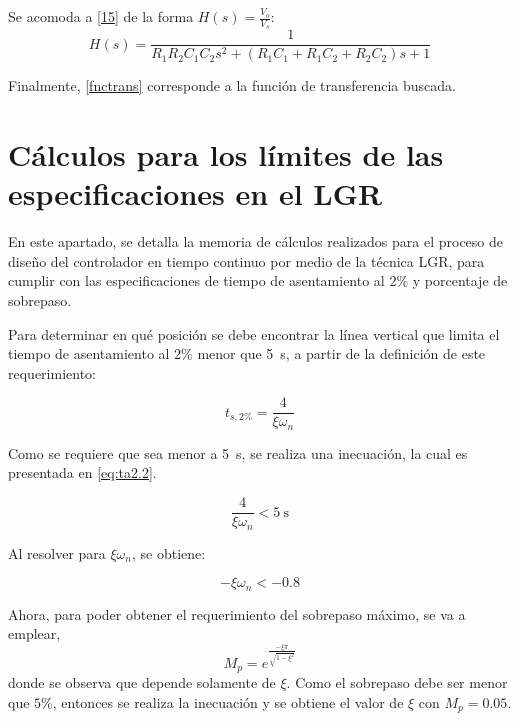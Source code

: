 Se acomoda a \eqref{15} de la forma $H(s) = \frac{V_o}{V_s}$:
\begin{equation}
   H(s) = \frac{1}{R_1 R_2 C_1 C_2 s^2 + (R_1 C_1 + R_1 C_2 +R_2 C_2)s+1}
   \label{fnctrans}
\end{equation}

Finalmente, \eqref{fnctrans} corresponde a la función de transferencia buscada.

\section{Cálculos para los límites de las especificaciones en el LGR} \label{anexoB}

En este apartado, se detalla la memoria de cálculos realizados para el proceso de diseño del controlador en tiempo continuo por medio de la técnica LGR, para cumplir con las especificaciones de tiempo de asentamiento al $2 \%$ y porcentaje de sobrepaso.

Para determinar en qué posición se debe encontrar la línea vertical que limita el tiempo de asentamiento al $2\%$ menor que \SI{5}{\second}, a partir de la definición de este requerimiento:

\begin{equation} \label{eq:ta2.1}
    t_{s,2\%}=\frac{4}{\xi\omega_n} 
\end{equation}

Como se requiere que sea menor a \SI{5}{\second}, se realiza una inecuación, la cual es presentada en \eqref{eq:ta2.2}.

\begin{equation}\label{eq:ta2.2}
    \frac{4}{\xi\omega_n} < \SI{5}{\second}
\end{equation}

Al resolver para $\xi\omega_n$, se obtiene:

\begin{equation} \label{valor_xiomega}
    -\xi\omega_n < -0.8    
\end{equation}

Ahora, para poder obtener el requerimiento del sobrepaso máximo, se va a emplear, 
\begin{equation} \label{eq:overshoot}
    M_p = e^{\frac{-\xi \pi}{\sqrt{1-\xi^2}}}
\end{equation}
\noindent donde se observa que depende solamente de $\xi$.
Como el sobrepaso debe ser menor que $5\%$, entonces se realiza la inecuación y se obtiene el valor de $\xi$ con $M_p = 0.05$. 

